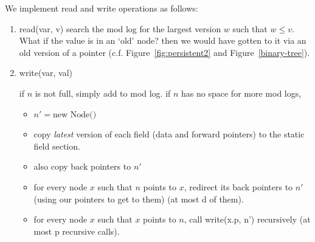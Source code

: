 \documentclass[11pt]{article}
\newcommand{\code}{\ttfamily}
\begin{document}
We implement read and write operations as follows:

\begin{enumerate}
\item {{\code read(var, v)}} search the mod log for the largest version \(w\) such that  \( w \leq v \). 
What if the value is in an `old' node?  then we would have gotten to it via an old version of a pointer (c.f. Figure~\ref{fig:persistent2} and Figure~\ref{binary-tree}).

\item {{\code write(var, val)}}

if \(n\) is not full, simply add to mod log.
if \(n\) has no space for more mod logs, 
\begin{itemize}
\item \(n' = \mbox{new Node()}\)
\item copy {\em latest} version of each field (data and forward pointers) to the static field section.
\item also copy back pointers to \(n'\)
\item for every node \(x\) such that \(n\) points to \(x\), redirect its back pointers to \(n'\) (using our pointers to get to them) (at most d of them).
\item for every node \(x\) such that \(x\) points to \(n\), call {\code write(x.p, n')} recursively (at most p recursive calls).

\end{itemize}
\end{enumerate}
\end{document}
